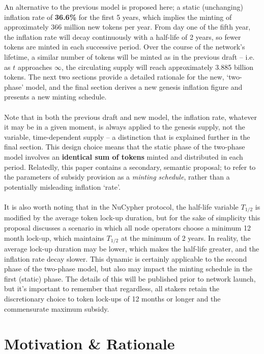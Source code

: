 \documentclass[8pt]{article}
\begin{document}
An alternative to the previous model is proposed here; a static (unchanging) inflation rate of \textbf{36.6\%} for the first 5 years, which implies the minting of approximately 366 million new tokens per year. From day one of the fifth year, the inflation rate will decay continuously with a half-life of 2 years, so fewer tokens are minted in each successive period. Over the course of the network's lifetime, a similar number of tokens will be minted as in the previous draft – i.e. as $t$ approaches $\infty$, the circulating supply will reach approximately 3.885 billion tokens. The next two sections provide a detailed rationale for the new, `two-phase' model, and the final section derives a new genesis inflation figure and presents a new minting schedule.
\\\\
Note that in both the previous draft and new model, the inflation rate, whatever it may be in a given moment, is always applied to the genesis supply, not the variable, time-dependent supply – a distinction that is explained further in the final section. This design choice means that the static phase of the two-phase model involves an \textbf{identical sum of tokens} minted and distributed in each period. Relatedly, this paper contains a secondary, semantic proposal; to refer to the parameters of subsidy provision as a \textit{minting schedule}, rather than a potentially misleading inflation `rate'. 
\\\\
It is also worth noting that in the NuCypher protocol, the half-life variable $T_{1/2}$ is modified by the average token lock-up duration, but for the sake of simplicity this proposal discusses a scenario in which all node operators choose a minimum 12 month lock-up, which maintains $T_{1/2}$ at the minimum of $2$ years. In reality, the average lock-up duration may be lower, which makes the half-life greater, and the inflation rate decay slower. This dynamic is certainly applicable to the second phase of the two-phase model, but also may impact the minting schedule in the first (static) phase. The details of this will be published prior to network launch, but it's important to remember that regardless, all stakers retain the discretionary choice to token lock-ups of 12 months or longer and the commensurate maximum subsidy. 

\section{Motivation \& Rationale}
\end{document}
